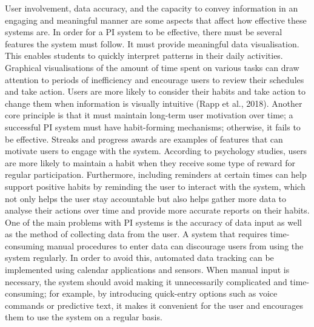 \documentclass[12pt,a4paper]{article}
\begin{document}
User involvement, data accuracy, and the capacity to convey information in an engaging and meaningful manner are some aspects that affect how effective these systems are. In order for a PI system to be effective, there must be several features the system must follow. It must provide meaningful data visualisation. This enables students to quickly interpret patterns in their daily activities. Graphical visualisations of the amount of time spent on various tasks can draw attention to periods of inefficiency and encourage users to review their schedules and take action. Users are more likely to consider their habits and take action to change them when information is visually intuitive (Rapp et al., 2018). Another core principle is that it must maintain long-term user motivation over time; a successful PI system must have habit-forming mechanisms; otherwise, it fails to be effective. Streaks and progress awards are examples of features that can motivate users to engage with the system. According to psychology studies, users are more likely to maintain a habit when they receive some type of reward for regular participation. Furthermore, including reminders at certain times can help support positive habits by reminding the user to interact with the system, which not only helps the user stay accountable but also helps gather more data to analyse their actions over time and provide more accurate reports on their habits. One of the main problems with PI systems is the accuracy of data input as well as the method of collecting data from the user. A system that requires time-consuming manual procedures to enter data can discourage users from using the system regularly. In order to avoid this, automated data tracking can be implemented using calendar applications and sensors. When manual input is necessary, the system should avoid making it unnecessarily complicated and time-consuming; for example, by introducing quick-entry options such as voice commands or predictive text, it makes it convenient for the user and encourages them to use the system on a regular basis.
\end{document}
